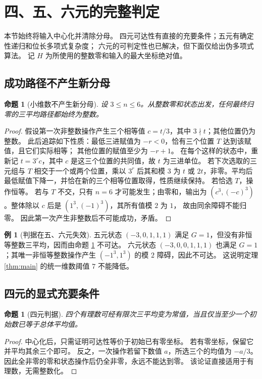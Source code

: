 \documentclass[UTF8,fontset=fandol,zihao=-4,a4paper]{ctexart}
\numberwithin{equation}{section}
\newtheorem{proposition}[theorem]{命题}
\theoremstyle{definition}
\newtheorem{example}[theorem]{例}
\begin{document}
\section{四、五、六元的完整判定}\label{sec:boundary}

本节始终将输入中心化并清除分母。
四元可达性有直接的充要条件；五元有确定性递归和位长多项式复杂度；
六元的可判定性也已解决，但下面仅给出伪多项式算法。
记 $H$ 为所使用的整数零和输入的最大坐标绝对值。

\subsection{成功路径不产生新分母}

\begin{proposition}[小维数不产生新分母]\label{prop:small-integral}
设 $3\le n\le6$。从整数零和状态出发，任何最终归零的三平均路径都始终为整数。
\end{proposition}
\begin{proof}
假设第一次非整数操作产生三个相等值 $c=t/3$，其中 $3\nmid t$；其他位置仍为整数。
此后追踪如下性质：最低三进赋值为 $-r<0$，恰有三个位置 $T$ 达到该赋值，且它们实际相等；
其他位置的赋值至少为 $-r+1$。
在每个这样的状态中，重新记 $t=3^r c$，其中 $c$ 是这三个位置的共同值，故 $t$ 为三进单位。
若下次选取的三元组与 $T$ 相交于一个或两个位置，乘以 $3^r$ 后其和模 $3$ 为
$t$ 或 $2t$，非零。平均后最低赋值下降一，并恰在新的三个相等位置取得，性质继续保持。
若恰选 $T$，操作恒等。
若与 $T$ 不交，只有 $n=6$ 才可能发生；由零和，输出为
$(c^3,(-c)^3)$。整体除以 $c$ 后是 $(1^3,(-1)^3)$，其所有值模 $2$ 为 $1$，
故由同余障碍不能归零。
因此第一次产生非整数后不可能成功，矛盾。
\end{proof}

\begin{example}[判据在五、六元失效]
五元状态 $(-3,0,1,1,1)$ 满足 $G=1$，但没有非恒等整数三平均，因而由命题
\ref{prop:small-integral} 不可达。
六元状态 $(-3,0,0,1,1,1)$ 也满足 $G=1$；其唯一非恒等整数操作产生
$(-1^3,1^3)$ 的模 $2$ 障碍，因此不可达。
这说明定理 \ref{thm:main} 的统一维数阈值 $7$ 不能降低。
\end{example}

\subsection{四元的显式充要条件}

\begin{proposition}[四元判据]\label{prop:four}
四个有理数可经有限次三平均变为常值，当且仅当至少一个初始数已等于总体平均值。
\end{proposition}
\begin{proof}
中心化后，只需证明可达性等价于初始已有零坐标。
若有零坐标，保留它并平均其余三个即可。
反之，一次操作若留下数值 $a$，所选三个的均值为 $-a/3$。
因此全非零的零和状态操作后仍全非零，永远不能达到零。
该论证直接适用于有理数，无需整数化。
\end{proof}
\end{document}

